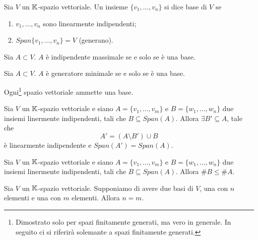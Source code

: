 \begin{definition}[Base]
	Sia $ V $ un $ \mathbb{K} $-spazio vettoriale. Un insieme $ \{v_1, \ldots, v_n\} $ si dice base di $ V $ se
	\begin{enumerate}[label=(\roman*)]
		\item $ v_1, \ldots, v_n $ sono linearmente indipendenti;
		\item $ Span\{v_1, \ldots , v_n\} = V $ (generano).
	\end{enumerate}
\end{definition}

\begin{lemma}
	Sia $A \subset V$. $A$ è indipendente massimale se e solo se è una base. 
\end{lemma}

\begin{lemma}
        Sia $A \subset V$. $A$ è generatore minimale se e solo se è una base.
\end{lemma}

\begin{thm}
	Ogni\footnote{Dimostrato solo per spazi finitamente generati, ma vero in generale. In seguito ci si riferirà solemante a spazi finitamente generati.} 
	spazio vettoriale ammette una base.
\end{thm}


\begin{lemma}
	Sia $ V $ un $ \mathbb{K} $-spazio vettoriale e siano $ A = \{v_1, \ldots, v_m\} $ e $ B = \{  w_1, \ldots, w_n \} $ due insiemi linermente indipendenti,
	tali che $ B \subseteq Span(A) $. Allora $\exists B' \subseteq A $, tale che
	\[ A' = \left ( A \setminus B' \right ) \cup B \] è linearmente indipendente e $Span(A') = Span(A)$. 
\end{lemma}

\begin{corollary}
        Sia $ V $ un $ \mathbb{K} $-spazio vettoriale e siano $ A = \{v_1, \ldots, v_m\} $ e $ B = \{  w_1, \ldots, w_n \} $ due insiemi linermente indipendenti,
        tali che $ B \subseteq Span(A) $. Allora $ \#B \le \#A $.
\end{corollary}

\begin{thm}
        Sia $ V $ un $ \mathbb{K} $-spazio vettoriale. Supponiamo di avere due basi di $ V $, una con $ n $ elementi e una con $ m $ elementi. Allora $ n = m $.
\end{thm}

